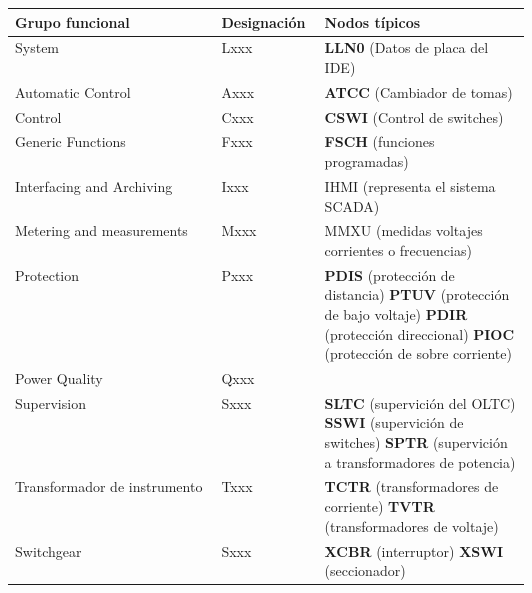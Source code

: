 \documentclass[a5paper]{book}%
\begin{document}
\begin{table}[H]
  \centering
  \label{Ejemplos de nodos Lógicos}

  \small
  \begin{tabular}{|l | p{0.2\linewidth} |p{0.4\linewidth}|}
    \hline
    Grupo funcional & Designación & Nodos típicos \\\hline
    System & Lxxx & \textbf{LLN0} (Datos de placa del IDE) \\\hline
    Automatic Control & Axxx & \textbf{ATCC} (Cambiador de tomas) \\\hline
    Control & Cxxx & \textbf{CSWI}  (Control de switches)  \\\hline
    Generic Functions & Fxxx & \textbf{FSCH} (funciones programadas) \\\hline
    Interfacing and Archiving & Ixxx & IHMI (representa el sistema SCADA) \\\hline
    Metering  and measurements & Mxxx & MMXU (medidas voltajes corrientes  o frecuencias) \\\hline
    Protection & Pxxx & \textbf{PDIS} (protección de distancia) \textbf{PTUV} (protección de bajo voltaje) \textbf{PDIR} (protección direccional) \textbf{PIOC} (protección de sobre corriente)\\\hline

    Power Quality & Qxxx & \\\hline
    Supervision & Sxxx & \textbf{SLTC} (supervición del OLTC) \textbf{SSWI} (supervición de switches) \textbf{SPTR} (supervición a transformadores de potencia) \\\hline

    Transformador de instrumento & Txxx  & \textbf{TCTR} (transformadores de corriente) \textbf{TVTR} (transformadores de voltaje) \\\hline

    Switchgear & Sxxx & \textbf{XCBR} (interruptor) \textbf{XSWI} (seccionador) \\\hline
   
    \end{tabular}
  \end{table}
\end{document}
